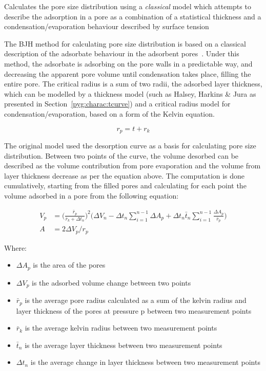 Calculates the pore size distribution using a \textit{classical} model which attempts to
describe the adsorption in a pore as a combination of a statistical thickness and
a condensation/evaporation behaviour described by surface tension

The BJH method for calculating pore size distribution
is based on a classical description of the adsorbate behaviour in the adsorbent
pores~\cite{barrettDeterminationPoreVolume1951}.
Under this method, the adsorbate is adsorbing on the pore walls in a predictable way,
and decreasing the apparent pore volume until condensation takes place, filling the
entire pore. The critical radius is a sum of two radii, the adsorbed
layer thickness, which can be modelled by a thickness model
(such as Halsey, Harkins \& Jura as presented in Section~\ref{pyg:charac:tcurve})
and a critical radius model for condensation/evaporation,
based on a form of the Kelvin equation.

\begin{equation}
	r_p = t + r_k
\end{equation}

The original model used the desorption curve as a basis for calculating pore size distribution.
Between two points of the curve, the volume desorbed can be described as the volume contribution
from pore evaporation and the volume from layer thickness decrease as per the equation
above. The computation is done cumulatively, starting from the filled pores and
calculating for each point the volume adsorbed in a pore from the following equation:

\begin{align}
	V_p & = \Big( \frac{\bar{r}_p}{\bar{r}_k + \Delta t_n} \Big)^2
	\Big(\Delta V_n - \Delta t_n \sum_{i=1}^{n-1} \Delta A_p
	+ \Delta t_n \bar{t}_n \sum_{i=1}^{n-1} \frac{\Delta A_p}{\bar{r}_p}\Big) \\
	A   & = 2 \Delta V_p / r_p
\end{align}

Where:

\begin{itemize}

	\item \(\Delta A_p\) is the area of the pores
	\item \(\Delta V_p\) is the adsorbed volume change between two points
	\item \(\bar{r}_p\) is the average pore radius calculated as a sum of the
	      kelvin radius and layer thickness of the pores at pressure p between two
	      measurement points
	\item \(\bar{r}_k\) is the average kelvin radius between two measurement points
	\item \(\bar{t}_n\) is the average layer thickness between two measurement points
	\item \(\Delta t_n\) is the average change in layer thickness between two measurement points

\end{itemize}

